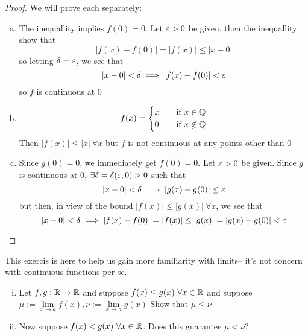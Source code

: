 \begin{proof}
    We will prove each separately:
    \begin{enumerate}[(a)]
        \item The inequallity implies $f(0) = 0$. Let $\varepsilon > 0$ be given, then the inequallity show that
        $$|f(x) - f(0)| = |f(x)| \leq |x - 0|$$
        so letting $\delta = \varepsilon$, we see that
        $$|x-0| < \delta \implies |f(x) - f(0)| < \varepsilon$$
        so $f$ is continuous at $0$
        \item \[ f(x) =
            \begin{cases}
            x       & \quad \text{if } x \in \mathbb Q \\
            0       & \quad \text{if } x \notin \mathbb Q
            \end{cases}
        \]
        Then $|f(x)| \leq |x|\ \forall x$ but $f$ is not continuous at any points other than $0$
        \item Since $g(0) = 0$, we immediately get $f(0) = 0$. Let $\varepsilon > 0$ be given.
        Since $g$ is continuous at $0$, $\exists \delta = \delta(\varepsilon, 0) > 0$ such that
        $$|x - 0| < \delta \implies |g(x) - g(0)| \leq \varepsilon$$
        but then, in view of the bound $|f(x)| \leq |g(x)|\ \forall x$, we see that
        $$|x - 0| < \delta \implies |f(x) - f(0)| = |f(x)| \leq |g(x)| = |g(x)-g(0)| < \varepsilon$$
    \end{enumerate} 
\end{proof}

\begin{example}
    This exercis is here to help us gain more familiarity with limits-- it's not concern with 
    continuous functions per se.
    \begin{enumerate}[(i)]
        \item Let $f, g: \mathbb R \to \mathbb R$ and suppose $f(x) \leq g(x)\ \forall x \in \mathbb R$ and suppose 
        $\mu := \lim\limits_{x\to a} f(x), \nu := \lim\limits_{x\to a}g(x)$
        Show that $\mu \leq \nu$
        \item Now suppose $f(x) < g(x)\ \forall x \in \mathbb R$. Does this guarantee $\mu < \nu$?
    \end{enumerate}
\end{example}

